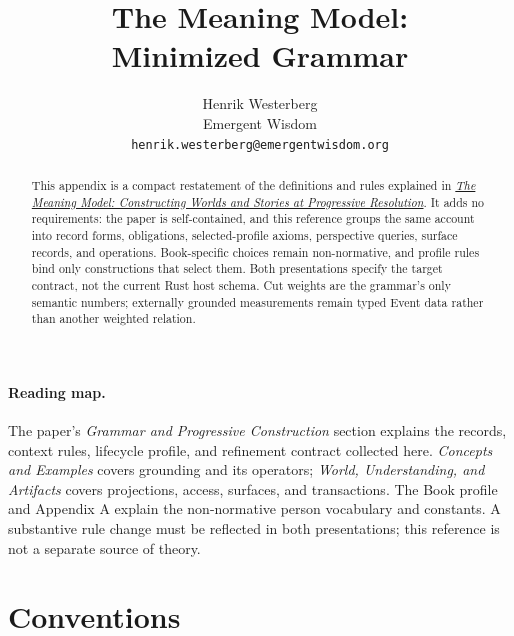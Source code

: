 \documentclass[11pt,a4paper]{article}
\title{The Meaning Model:\\Minimized Grammar}
\author{Henrik Westerberg\\Emergent Wisdom\\
  \texttt{henrik.westerberg@emergentwisdom.org}}
\begin{document}
\maketitle

\begin{abstract}
This appendix is a compact restatement of the definitions and rules explained
in \href{https://doi.org/10.5281/zenodo.22313515}{\emph{The Meaning Model:
Constructing Worlds and Stories at Progressive Resolution}}. It adds no
requirements: the paper is self-contained, and this
reference groups the same account into record forms, obligations, selected-profile
axioms, perspective queries, surface records, and operations. Book-specific
choices remain non-normative, and profile rules bind only constructions that
select them. Both presentations specify the target contract, not the current
Rust host schema. Cut weights are the grammar's only semantic numbers;
externally grounded measurements remain typed Event data rather than another
weighted relation.
\end{abstract}


\paragraph{Reading map.}
The paper's \emph{Grammar and Progressive Construction} section explains the
records, context rules, lifecycle profile, and refinement contract collected
here. \emph{Concepts and Examples} covers grounding and its operators;
\emph{World, Understanding, and Artifacts} covers projections, access, surfaces,
and transactions. The Book profile and Appendix A explain the non-normative
person vocabulary and constants. A substantive rule change must be reflected
in both presentations; this reference is not a separate source of theory.

\section{Conventions}
\end{document}
